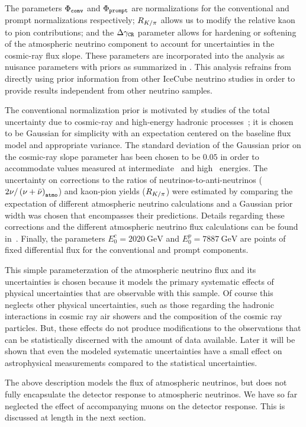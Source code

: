 The parameters $\Phi_\texttt{conv}$ and $\Phi_\texttt{prompt}$ are normalizations for the conventional and prompt normalizations respectively; $R_{K/\pi}$ allows us to modify the relative kaon to pion contributions; and the $\Delta\gamma_\texttt{CR}$ parameter allows for hardening or softening of the atmospheric neutrino component to account for uncertainties in the cosmic-ray flux slope.
These parameters are incorporated into the analysis as nuisance parameters with priors as summarized in .
This analysis refrains from directly using prior information from other IceCube neutrino studies in order to provide results independent from other neutrino samples.

The conventional normalization prior is motivated by studies of the total uncertainty due to cosmic-ray and high-energy hadronic processes~\cite{Fedynitch:2012fs}; it is chosen to be Gaussian for simplicity with an expectation centered on the baseline flux model and appropriate variance.
The standard deviation of the Gaussian prior on the cosmic-ray slope parameter has been chosen to be $0.05$ in order to accommodate values measured at intermediate~\cite{Karelin:2011zz} and high~\cite{Bartoli:2015fhw,Yoon:2017qjx,Alfaro:2017cwx} energies.
The uncertainty on corrections to the ratios of neutrinos-to-anti-neutrinos (${2\nu/\left(\nu+\bar{\nu}\right)}_\texttt{atmo}$) and kaon-pion yields ($R_{K/\pi}$) were estimated by comparing the expectation of different atmospheric neutrino calculations and a Gaussian prior width was chosen that encompasses their predictions.
Details regarding these corrections and the different atmospheric neutrino flux calculations can be found in~\cite{CollinFluxes,Jones:2015bya}.
Finally, the parameters $E_0^c=\SI{2020}\GeV$ and $E_0^p=\SI{7887}\GeV$ are points of fixed differential flux for the conventional and prompt components.

This simple parameterzation of the atmospheric neutrino flux and its uncertainties is chosen because it models the primary systematic effects of physical uncertainties that are observable with this sample.
Of course this neglects other physical uncertainties, such as those regarding the hadronic interactions in cosmic ray air showers and the composition of the cosmic ray particles.
But, these effects do not produce modifications to the observations that can be statistically discerned with the amount of data available.
Later it will be shown that even the modeled systematic uncertainties have a small effect on astrophysical measurements compared to the statistical uncertainties.

The above description models the flux of atmospheric neutrinos, but does not fully encapsulate the detector response to atmospheric neutrinos.
We have so far neglected the effect of accompanying muons on the detector response.
This is discussed at length in the next section.

